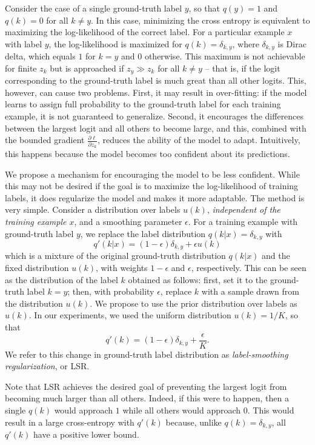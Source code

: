 \documentclass[10pt,twocolumn,letterpaper]{article}
\begin{document}
Consider the case of a single ground-truth label $y$, so that $q(y)=1$ and
$q(k)=0$ for all $k\neq y$. In this case, minimizing the cross entropy is
equivalent to maximizing the log-likelihood of the correct label. For a
particular example $x$ with label $y$, the log-likelihood is maximized for $q(k)
= \delta_{k,y}$, where $\delta_{k,y}$ is Dirac delta, which equals $1$ for $k=y$
and $0$ otherwise. This maximum is not achievable for finite $z_k$ but is
approached if $z_y\gg z_k$ for all $k\neq y$ -- that is, if the logit
corresponding to the ground-truth label is much great than all other
logits. This, however, can cause two problems. First, it may result in
over-fitting: if the model learns to assign full probability to the ground-truth
label for each training example, it is not guaranteed to generalize. Second, it
encourages the differences between the largest logit and all others to become
large, and this, combined with the bounded gradient
$\frac{\partial\ell}{\partial z_k}$, reduces the ability of the model to
adapt. Intuitively, this happens because the model becomes too confident about
its predictions.

We propose a mechanism for encouraging the model to be less confident. While
this may not be desired if the goal is to maximize the log-likelihood of
training labels, it does regularize the model and makes it more adaptable. The
method is very simple. Consider a distribution over labels $u(k)$, {\em
  independent of the training example $x$}, and a smoothing parameter $\epsilon$.
 For a training example with ground-truth label $y$, we
replace the label distribution $q(k|x)=\delta_{k,y}$ with
$$
q'(k|x) = (1-\epsilon) \delta_{k,y} + \epsilon u(k)
$$
which is a mixture of the original ground-truth distribution $q(k|x)$ and the
fixed distribution $u(k)$, with weights $1-\epsilon$ and $\epsilon$,
respectively. This can be seen as the distribution of the label $k$ obtained as
follows: first, set it to the ground-truth label $k=y$; then, with probability
$\epsilon$, replace $k$ with a sample drawn from the distribution $u(k)$. We
propose to use the prior distribution over labels as $u(k)$. In our experiments,
we used the uniform distribution $u(k) = 1/K$, so that
$$
q'(k) = (1-\epsilon) \delta_{k,y} + \frac{\epsilon}{K}.
$$
We refer to this change in ground-truth label distribution as {\em
  label-smoothing regularization}, or LSR.

Note that LSR achieves the desired goal of preventing the largest logit from
becoming much larger than all others. Indeed, if this were to happen, then a
single $q(k)$ would approach $1$ while all others would approach $0$. This would
result in a large cross-entropy with $q'(k)$ because, unlike
$q(k)=\delta_{k,y}$, all $q'(k)$ have a positive lower bound.
\end{document}
